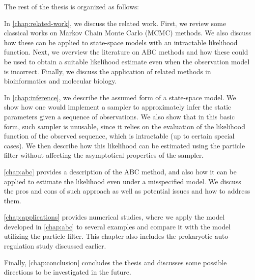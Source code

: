 The rest of the thesis is organized as follows:

In \autoref{chap:related-work}, we discuss the related work. First, we review some classical works on Markov Chain Monte Carlo (MCMC) methods. We also discuss how these can be applied to state-space models with an intractable likelihood function. Next, we overview the literature on ABC methods and how these could be used to obtain a suitable likelihood estimate even when the observation model is incorrect. Finally, we discuss the application of related methods in bioinformatics and molecular biology.

In \autoref{chap:inference}, we describe the assumed form of a state-space model. We show how one would implement a sampler to approximately infer the static parameters given a sequence of observations. We also show that in this basic form, such sampler is unusable, since it relies on the evaluation of the likelihood function of the observed sequence, which is intractable (up to certain special cases). We then describe how this likelihood can be estimated using the particle filter \citep{particle-filter} without affecting the asymptotical properties of the sampler.

\autoref{chap:abc} provides a description of the ABC method, and also how it can be applied to estimate the likelihood even under a misspecified model. We discuss the pros and cons of such approach as well as potential issues and how to address them.

\autoref{chap:applications} provides numerical studies, where we apply the model developed in \autoref{chap:abc} to several examples and compare it with the model utilizing the particle filter. This chapter also includes the prokaryotic auto-regulation study discussed earlier.

Finally, \autoref{chap:conclusion} concludes the thesis and discusses some possible directions to be investigated in the future.
